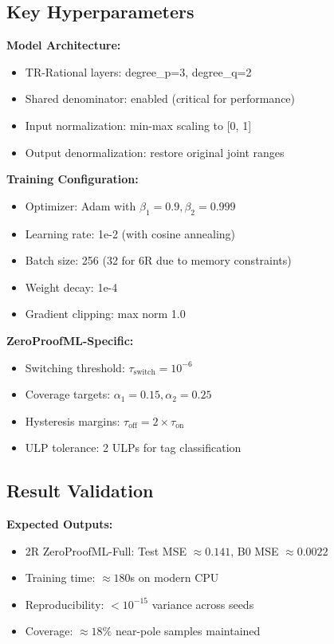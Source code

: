 \documentclass[twoside,11pt]{article}
\begin{document}
\subsection{Key Hyperparameters}

\textbf{Model Architecture:}
\begin{itemize}
\item TR-Rational layers: degree\_p=3, degree\_q=2
\item Shared denominator: enabled (critical for performance)
\item Input normalization: min-max scaling to [0, 1]
\item Output denormalization: restore original joint ranges
\end{itemize}

\textbf{Training Configuration:}
\begin{itemize}
\item Optimizer: Adam with $\beta_1=0.9, \beta_2=0.999$
\item Learning rate: 1e-2 (with cosine annealing)
\item Batch size: 256 (32 for 6R due to memory constraints)
\item Weight decay: 1e-4
\item Gradient clipping: max norm 1.0
\end{itemize}

\textbf{ZeroProofML-Specific:}
\begin{itemize}
\item Switching threshold: $\tau_{\text{switch}} = 10^{-6}$
\item Coverage targets: $\alpha_1 = 0.15, \alpha_2 = 0.25$
\item Hysteresis margins: $\tau_{\text{off}} = 2 \times \tau_{\text{on}}$
\item ULP tolerance: 2 ULPs for tag classification
\end{itemize}

\subsection{Result Validation}

\textbf{Expected Outputs:}
\begin{itemize}
\item 2R ZeroProofML-Full: Test MSE $\approx 0.141$, B0 MSE $\approx 0.0022$
\item Training time: $\approx 180$s on modern CPU
\item Reproducibility: $< 10^{-15}$ variance across seeds
\item Coverage: $\approx 18\%$ near-pole samples maintained
\end{itemize}
\end{document}
